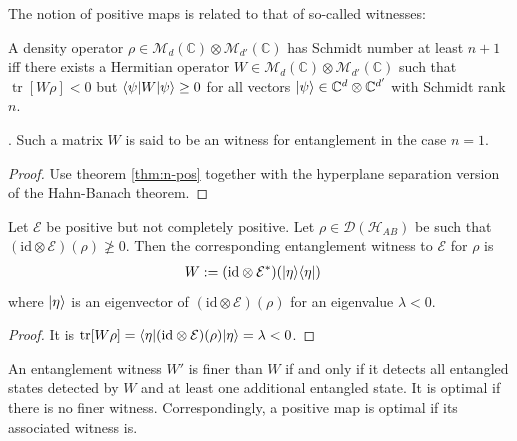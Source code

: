The notion of positive maps is related to that of so-called witnesses:
\begin{prop}
A density operator $\rho \in \mathcal{M}_d(\mathbb{C}) \otimes \mathcal{M}_{d'}(\mathbb{C})$ has Schmidt number at least $n+1$ iff there exists a Hermitian operator $W \in \mathcal{M}_d(\mathbb{C}) \otimes \mathcal{M}_{d'}(\mathbb{C})$ such that $\operatorname{tr}[W\rho] < 0$ but $\langle\psi\rvert W\lvert\psi\rangle \geq 0$ for all vectors $\lvert\psi\rangle \in \mathbb{C}^d \otimes \mathbb{C}^{d'}$ with Schmidt rank $n$.
\end{prop}. Such a matrix $W$ is said to be an witness for entanglement in the case $n=1$.
\begin{proof}
Use theorem \ref{thm:n-pos} together with the hyperplane separation version of the Hahn-Banach theorem.
\end{proof}

\begin{prop}
Let $\mathcal{E}$ be positive but not completely positive. Let $\rho \in \mathcal{D}(\mathcal{H}_{AB})$ be such that $(\text{id} \otimes \mathcal{E})(\rho) \not\geq 0$. Then the corresponding entanglement witness to $\mathcal{E}$ for $\rho$ is 
\begin{align*}
    W &:= (\text{id} \otimes \mathcal{E}^*)(\lvert\eta\rangle\langle\eta\rvert)
\end{align*}
where $\lvert\eta\rangle$ is an eigenvector of $(\text{id} \otimes \mathcal{E})(\rho)$ for an eigenvalue $\lambda < 0$.
\end{prop}

\begin{proof}
It is $
    \text{tr}[W\rho] = \langle\eta\rvert(\text{id} \otimes \mathcal{E})(\rho)\lvert\eta\rangle = \lambda < 0$.
\end{proof}


\begin{definition}
An entanglement witness $W'$ is finer than $W$ if and only if it detects all entangled states detected by $W$ and at least one additional entangled state. It is optimal if there is no finer witness. Correspondingly, a positive map is optimal if its associated witness is.
\end{definition}

